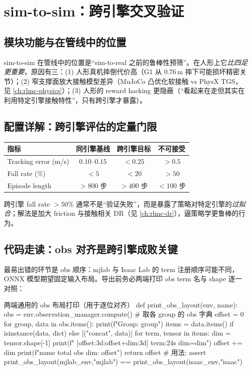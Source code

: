 \section{sim-to-sim：跨引擎交叉验证}\label{sec:rlmc-hl-sim2sim}

\subsection{模块功能与在管线中的位置}
sim-to-sim 在管线中的位置是“sim-to-real 之前的鲁棒性预筛”。在人形上它\emph{比四足更重要}，原因有三：(1) 人形真机摔倒代价高（G1 从 $0.76$\,m 摔下可能损坏精密关节）；(2) 窄支撑面放大接触模型差异（MuJoCo 凸优化软接触 vs PhysX TGS，见 \cref{ch:rlmc-physics}）；(3) 人形的 reward hacking 更隐蔽（“看起来在走但其实在利用特定引擎接触特性”，只有跨引擎才暴露）。

\subsection{配置详解：跨引擎评估的定量门限}

\begin{center}
\small
\begin{tabular}{lccc}
\hline
指标 & 同引擎基线 & 跨引擎目标 & 不可接受 \\
\hline
Tracking error (m/s) & $0.10$--$0.15$ & $<0.25$ & $>0.5$ \\
Fall rate (\%) & $<5$ & $<20$ & $>50$ \\
Episode length & $>800$ 步 & $>400$ 步 & $<100$ 步 \\
\hline
\end{tabular}
\end{center}

跨引擎 fall rate $>50\%$ 通常不是“验证失败”，而是暴露了策略对特定引擎的\emph{过拟合}；解法是加大 friction 与接触相关 DR（见 \cref{ch:rlmc-dr}），逼策略学更鲁棒的行为。

\subsection{代码走读：obs 对齐是跨引擎成败关键}
最易出错的环节是 obs 顺序：mjlab 与 Isaac Lab 的 term 注册顺序可能不同，ONNX 模型期望固定输入布局。导出前务必两端打印 obs term 名与 shape 逐一对照：

\begin{codebox}[Python]{两端通用的 obs 布局打印（用于逐位对齐）}
def print_obs_layout(env, name):
    obs = env.observation_manager.compute()       # 取各 group 的 obs 字典
    offset = 0
    for group, data in obs.items():
        print(f"Group: {group}")
        items = data.items() if isinstance(data, dict) else [("concat", data)]
        for term, tensor in items:
            dim = tensor.shape[-1]
            print(f"  [{offset:3d}:{offset+dim:3d}] {term:24s} dim={dim}")
            offset += dim
    print(f"{name} total obs dim: {offset}")
    return offset
# 用法: assert print_obs_layout(mjlab_env,"mjlab") == print_obs_layout(isaac_env,"isaac")
\end{codebox}

